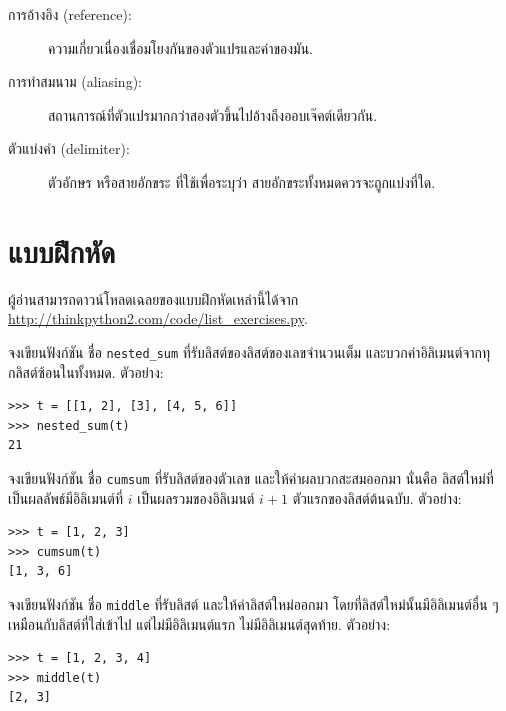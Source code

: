 \begin{description}
\item[การอ้างอิง (reference):] ความเกี่ยวเนื่องเชื่อมโยงกันของตัวแปรและค่าของมัน.

\item[การทำสมนาม (aliasing):] สถานการณ์ที่ตัวแปรมากกว่าสองตัวขึ้นไปอ้างถึงออบเจ๊คต์เดียวกัน.

\item[ตัวแบ่งคำ (delimiter):] ตัวอักษร หรือสายอักขระ ที่ใช้เพื่อระบุว่า สายอักขระทั้งหมดควรจะถูกแบ่งที่ใด.

\end{description}


\section{แบบฝึกหัด}

ผู้อ่านสามารถดาวน์โหลดเฉลยของแบบฝึกหัดเหล่านี้ได้จาก
\url{http://thinkpython2.com/code/list_exercises.py}.
\\

\begin{exercise}

จงเขียนฟังก์ชัน ชื่อ \verb|nested_sum| ที่รับลิสต์ของลิสต์ของเลขจำนวนเต็ม
และบวกค่าอิลิเมนต์จากทุกลิสต์ซ้อนในทั้งหมด.
ตัวอย่าง:

\begin{verbatim}
>>> t = [[1, 2], [3], [4, 5, 6]]
>>> nested_sum(t)
21
\end{verbatim}

\end{exercise}
\vspace{0.5cm}


\begin{exercise}
\label{cumulative}

จงเขียนฟังก์ชัน ชื่อ \texttt{cumsum} ที่รับลิสต์ของตัวเลข
และให้ค่าผลบวกสะสมออกมา 
นั่นคือ ลิสต์ใหม่ที่เป็นผลลัพธ์มีอิลิเมนต์ที่ $i$ เป็นผลรวมของอิลิเมนต์ $i+1$ ตัวแรกของลิสต์ต้นฉบับ.
ตัวอย่าง:


\begin{verbatim}
>>> t = [1, 2, 3]
>>> cumsum(t)
[1, 3, 6]
\end{verbatim}

\end{exercise}
\vspace{0.5cm}


\begin{exercise}
จงเขียนฟังก์ชัน ชื่อ \texttt{middle} ที่รับลิสต์
และให้ค่าลิสต์ใหม่ออกมา
โดยที่ลิสต์ใหม่นั้นมีอิลิเมนต์อื่น ๆ เหมือนกับลิสต์ที่ใส่เข้าไป แต่ไม่มีอิลิเมนต์แรก ไม่มีอิลิเมนต์สุดท้าย.
ตัวอย่าง:

\begin{verbatim}
>>> t = [1, 2, 3, 4]
>>> middle(t)
[2, 3]
\end{verbatim}

\end{exercise}
\vspace{0.5cm}



